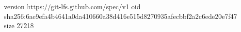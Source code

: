 version https://git-lfs.github.com/spec/v1
oid sha256:6ae9efa4b4641a0da410660a38d416e515d8270935afecbbf2a2c6ede20e7f47
size 27218
